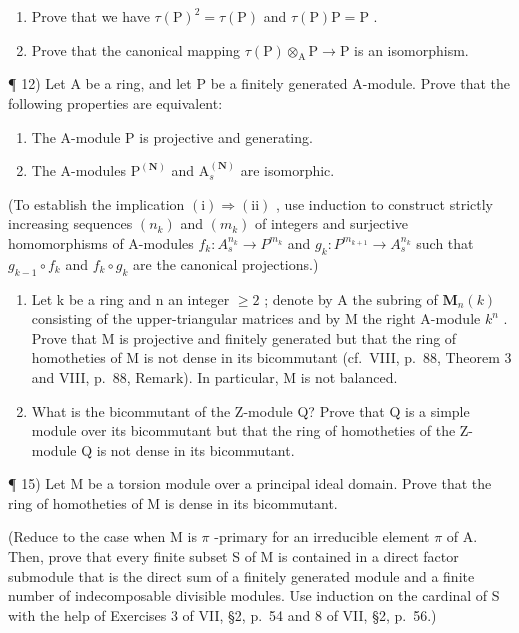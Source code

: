 \begin{enumerate}
\def\labelenumi{\alph{enumi})}
\item
  Prove that we have \(\tau(\mathrm{P})^2 = \tau(\mathrm{P})\) and \(\tau(\mathrm{P})\mathrm{P} = \mathrm{P}\) .
\item
  Prove that the canonical mapping \(\tau(\mathrm{P})\otimes_{\mathrm{A}}\mathrm{P}\to\mathrm{P}\) is an isomorphism.
\end{enumerate}

¶ 12) Let A be a ring, and let P be a finitely generated A-module. Prove that the following properties are equivalent:

\begin{enumerate}
\def\labelenumi{(\roman{enumi})}
\item
  The A-module P is projective and generating.
\item
  The A-modules \(\mathrm{P}^{(\mathbf{N})}\) and \(\mathrm{A}_s^{(\mathbf{N})}\) are isomorphic.
\end{enumerate}

(To establish the implication \((\mathrm{i})\Rightarrow(\mathrm{ii})\) , use induction to construct strictly increasing sequences \((n_{k})\) and \((m_{k})\) of integers and surjective homomorphisms of A-modules \(f_{k}:A_{s}^{n_{k}}\to P^{m_{k}}\) and \(g_{k}:P^{m_{k+1}}\to A_{s}^{n_{k}}\) such that \(g_{k-1}\circ f_{k}\) and \(f_{k}\circ g_{k}\) are the canonical projections.)

\begin{enumerate}
\def\labelenumi{\arabic{enumi})}
\setcounter{enumi}{12}
\item
  Let k be a ring and n an integer \(\geqslant 2\) ; denote by A the subring of \(\mathbf{M}_{n}(k)\) consisting of the upper-triangular matrices and by M the right A-module \(k^{n}\) . Prove that M is projective and finitely generated but that the ring of homotheties of M is not dense in its bicommutant (cf.~VIII, p.~88, Theorem 3 and VIII, p.~88, Remark). In particular, M is not balanced.
\item
  What is the bicommutant of the Z-module Q? Prove that Q is a simple module over its bicommutant but that the ring of homotheties of the Z-module Q is not dense in its bicommutant.
\end{enumerate}

¶ 15) Let M be a torsion module over a principal ideal domain. Prove that the ring of homotheties of M is dense in its bicommutant.

(Reduce to the case when M is \(\pi\) -primary for an irreducible element \(\pi\) of A. Then, prove that every finite subset S of M is contained in a direct factor submodule that is the direct sum of a finitely generated module and a finite number of indecomposable divisible modules. Use induction on the cardinal of S with the help of Exercises 3 of VII, §2, p.~54 and 8 of VII, §2, p.~56.)

